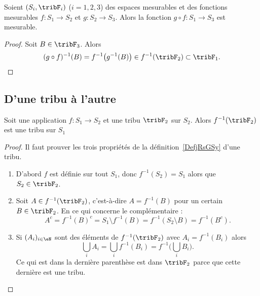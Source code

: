 \begin{proposition}     \label{PROPooEFHKooARJBwW}
    Soient \( (S_i,\tribF_i)\) (\( i=1,2,3\)) des espaces mesurables et des fonctions mesurables \( f\colon S_1\to S_2\) et \( g\colon S_2\to S_3\). Alors la fonction \( g\circ f\colon S_1\to S_3\) est mesurable.
\end{proposition}

\begin{proof}
    Soit \( B\in\tribF_3\). Alors
    \begin{equation}
        (g\circ f)^{-1}(B)=f^{-1}\big( g^{-1}(B) \big)\in f^{-1}(\tribF_2)\subset\tribF_1.
    \end{equation}
\end{proof}

\subsection{D'une tribu à l'autre}

\begin{lemma}       \label{LemooVDXJooZNYelH}
    Soit une application \( f\colon S_1\to S_2\) et une tribu \( \tribF_2\) sur \( S_2\). Alors \( f^{-1}(\tribF_2)\) est une tribu sur \( S_1\)
\end{lemma}

\begin{proof}
    Il faut prouver les trois propriétés de la définition~\ref{DefjRsGSy} d'une tribu.
    \begin{enumerate}
        \item
            D'abord \( f\) est définie sur tout \( S_1\), donc \( f^{-1}(S_2)=S_1\) alors que \( S_2\in \tribF_2\).
        \item
            Soit \( A\in f^{-1}(\tribF_2)\), c'est-à-dire \( A=f^{-1}(B)\) pour un certain \( B\in \tribF_2\). En ce qui concerne le complémentaire :
            \begin{equation}
                A^c=f^{-1}(B)^c=S_1\setminus f^{-1}(B)=f^{-1}(S_2\setminus B)=f^{-1}(B^c).
            \end{equation}
        \item
            Si \( (A_i)_{i\in \eN}\) sont des éléments de \( f^{-1}(\tribF_2)\) avec \( A_i=f^{-1}(B_i)\) alors
            \begin{equation}
                \bigcup_iA_i=\bigcup_if^{-1}(B_i)=f^{-1}\big( \bigcup_iB_i \big).
            \end{equation}
            Ce qui est dans la dernière parenthèse est dans \( \tribF_2\) parce que cette dernière est une tribu.
    \end{enumerate}
\end{proof}

